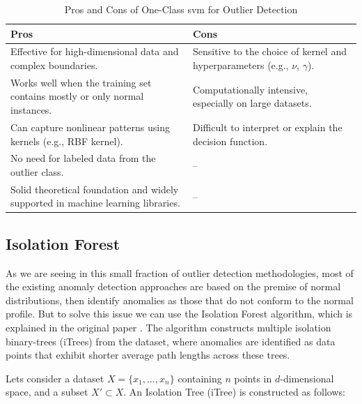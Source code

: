\documentclass[11pt,english,a4paper,hidelinks]{book}
\begin{document}
\begin{table}[H]
    \centering
    \begin{tabular}{|p{7cm}|p{7cm}|}
        \hline
        \textbf{Pros} & \textbf{Cons} \\
            \hline
            Effective for high-dimensional data and complex boundaries. & Sensitive to the choice of kernel and hyperparameters (e.g., \(\nu\), \(\gamma\)). \\
            \hline
            Works well when the training set contains mostly or only normal instances. & Computationally intensive, especially on large datasets. \\
            \hline
            Can capture nonlinear patterns using kernels (e.g., RBF kernel). & Difficult to interpret or explain the decision function. \\
            \hline
            No need for labeled data from the outlier class. & -- \\
            \hline
            Solid theoretical foundation and widely supported in machine learning libraries. & -- \\
        \hline
    \end{tabular}
    \caption{Pros and Cons of One-Class \acrshort{svm} for Outlier Detection}
\end{table}
    
    
\subsection{Isolation Forest}

As we are seeing in this small fraction of outlier detection methodologies, most of the existing anomaly detection approaches are based on the premise of normal distributions, then identify anomalies as those that do not conform to the normal profile. But to solve this issue we can use the Isolation Forest algorithm, which is explained in the original paper \textcite{liu2012isolation}. The algorithm constructs multiple isolation binary-trees (iTrees) from the dataset, where anomalies are identified as data points that exhibit shorter average path lengths across these trees.

\vspace{0.5cm}
\noindent Lets consider a dataset \(X = \{x_1, \dots, x_n\}\) containing \(n\) points in \(d\)-dimensional space, and a subset \(X' \subset X\). An Isolation Tree (iTree) is constructed as follows:
\end{document}
